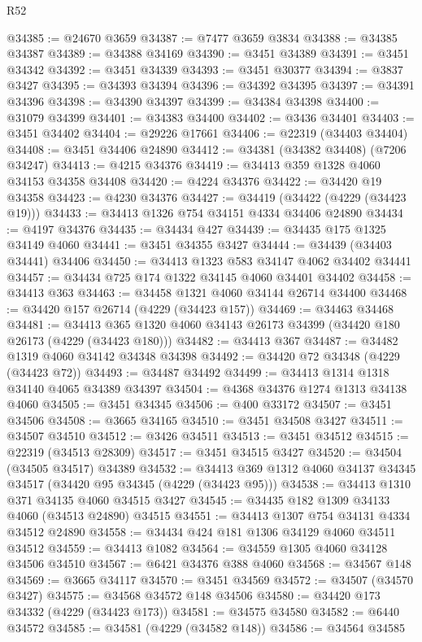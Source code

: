 \begin{lexlean}{R52}
\begin{coremodule}
@34385 := @24670 @3659
@34387 := @7477 @3659 @3834
@34388 := @34385 @34387
@34389 := @34388 @34169
@34390 := @3451 @34389
@34391 := @3451 @34342
@34392 := @3451 @34339
@34393 := @3451 @30377
@34394 := @3837 @3427
@34395 := @34393 @34394
@34396 := @34392 @34395
@34397 := @34391 @34396
@34398 := @34390 @34397
@34399 := @34384 @34398
@34400 := @31079 @34399
@34401 := @34383 @34400
@34402 := @3436 @34401
@34403 := @3451 @34402
@34404 := @29226 @17661
@34406 := @22319 (@34403 @34404)
@34408 := @3451 @34406 @24890
@34412 := @34381 (@34382 @34408) (@7206 @34247)
@34413 := @4215 @34376
@34419 := @34413 @359 @1328 @4060 @34153 @34358 @34408
@34420 := @4224 @34376
@34422 := @34420 @19 @34358
@34423 := @4230 @34376
@34427 := @34419 (@34422 (@4229 (@34423 @19)))
@34433 := @34413 @1326 @754 @34151 @4334 @34406 @24890
@34434 := @4197 @34376
@34435 := @34434 @427
@34439 := @34435 @175 @1325 @34149 @4060
@34441 := @3451 @34355 @3427
@34444 := @34439 (@34403 @34441) @34406
@34450 := @34413 @1323 @583 @34147 @4062 @34402 @34441
@34457 := @34434 @725 @174 @1322 @34145 @4060 @34401 @34402
@34458 := @34413 @363
@34463 := @34458 @1321 @4060 @34144 @26714 @34400
@34468 := @34420 @157 @26714 (@4229 (@34423 @157))
@34469 := @34463 @34468
@34481 := @34413 @365 @1320 @4060 @34143 @26173 @34399 (@34420 @180 @26173 (@4229 (@34423 @180)))
@34482 := @34413 @367
@34487 := @34482 @1319 @4060 @34142 @34348 @34398
@34492 := @34420 @72 @34348 (@4229 (@34423 @72))
@34493 := @34487 @34492
@34499 := @34413 @1314 @1318 @34140 @4065 @34389 @34397
@34504 := @4368 @34376 @1274 @1313 @34138 @4060
@34505 := @3451 @34345
@34506 := @400 @33172
@34507 := @3451 @34506
@34508 := @3665 @34165
@34510 := @3451 @34508 @3427
@34511 := @34507 @34510
@34512 := @3426 @34511
@34513 := @3451 @34512
@34515 := @22319 (@34513 @28309)
@34517 := @3451 @34515 @3427
@34520 := @34504 (@34505 @34517) @34389
@34532 := @34413 @369 @1312 @4060 @34137 @34345 @34517 (@34420 @95 @34345 (@4229 (@34423 @95)))
@34538 := @34413 @1310 @371 @34135 @4060 @34515 @3427
@34545 := @34435 @182 @1309 @34133 @4060 (@34513 @24890) @34515
@34551 := @34413 @1307 @754 @34131 @4334 @34512 @24890
@34558 := @34434 @424 @181 @1306 @34129 @4060 @34511 @34512
@34559 := @34413 @1082
@34564 := @34559 @1305 @4060 @34128 @34506 @34510
@34567 := @6421 @34376 @388 @4060
@34568 := @34567 @148
@34569 := @3665 @34117
@34570 := @3451 @34569
@34572 := @34507 (@34570 @3427)
@34575 := @34568 @34572 @148 @34506
@34580 := @34420 @173 @34332 (@4229 (@34423 @173))
@34581 := @34575 @34580
@34582 := @6440 @34572
@34585 := @34581 (@4229 (@34582 @148))
@34586 := @34564 @34585

\end{coremodule}
\end{lexlean}
